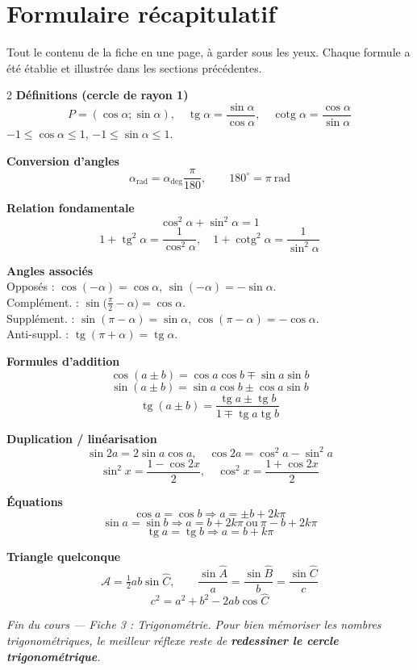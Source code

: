 \documentclass[11pt,a4paper]{article}
\DeclareMathOperator{\tg}{tg}        %
\DeclareMathOperator{\cotg}{cotg}    %
\newcommand{\degr}{^{\circ}}
\begin{document}
\section{Formulaire récapitulatif}
Tout le contenu de la fiche en une page, à garder sous les yeux. Chaque formule a été établie et
illustrée dans les sections précédentes.

\begin{tcolorbox}[boxbase,colback=primary!4,colframe=primary,
   title={\textsc{Mémo trigonométrie}}]
\setlength{\columnsep}{6mm}
\begin{multicols}{2}
\footnotesize
\textbf{\textcolor{primarydark}{Définitions (cercle de rayon 1)}}
\[
P=(\cos\alpha;\sin\alpha),\quad \tg\alpha=\frac{\sin\alpha}{\cos\alpha},\quad \cotg\alpha=\frac{\cos\alpha}{\sin\alpha}
\]
$-1\le\cos\alpha\le1$, \quad $-1\le\sin\alpha\le1$.

\smallskip
\textbf{\textcolor{primarydark}{Conversion d'angles}}
\[
\alpha_{\text{rad}}=\alpha_{\text{deg}}\frac{\pi}{180},\qquad
180\degr=\pi\ \text{rad}
\]

\textbf{\textcolor{primarydark}{Relation fondamentale}}
\[
\cos^2\alpha+\sin^2\alpha=1
\]
\[
1+\tg^2\alpha=\frac{1}{\cos^2\alpha},\quad 1+\cotg^2\alpha=\frac{1}{\sin^2\alpha}
\]

\textbf{\textcolor{primarydark}{Angles associés}}\\
Opposés : $\cos(-\alpha)=\cos\alpha$, $\sin(-\alpha)=-\sin\alpha$.\\
Complément. : $\sin\!\big(\tfrac{\pi}{2}-\alpha\big)=\cos\alpha$.\\
Supplément. : $\sin(\pi-\alpha)=\sin\alpha$, $\cos(\pi-\alpha)=-\cos\alpha$.\\
Anti-suppl. : $\tg(\pi+\alpha)=\tg\alpha$.

\columnbreak

\textbf{\textcolor{primarydark}{Formules d'addition}}
\[
\cos(a\pm b)=\cos a\cos b\mp\sin a\sin b
\]
\[
\sin(a\pm b)=\sin a\cos b\pm\cos a\sin b
\]
\[
\tg(a\pm b)=\frac{\tg a\pm\tg b}{1\mp\tg a\tg b}
\]

\textbf{\textcolor{primarydark}{Duplication / linéarisation}}
\[
\sin2a=2\sin a\cos a,\quad \cos2a=\cos^2a-\sin^2a
\]
\[
\sin^2x=\frac{1-\cos2x}{2},\quad \cos^2x=\frac{1+\cos2x}{2}
\]

\textbf{\textcolor{primarydark}{Équations}}
\[
\cos a=\cos b\Rightarrow a=\pm b+2k\pi
\]
\[
\sin a=\sin b\Rightarrow a=b+2k\pi\ \text{ou}\ \pi-b+2k\pi
\]
\[
\tg a=\tg b\Rightarrow a=b+k\pi
\]

\textbf{\textcolor{primarydark}{Triangle quelconque}}
\[
\mathcal{A}=\tfrac12 ab\sin\hat C,\qquad
\frac{\sin\hat A}{a}=\frac{\sin\hat B}{b}=\frac{\sin\hat C}{c}
\]
\[
c^2=a^2+b^2-2ab\cos\hat C
\]
\end{multicols}
\end{tcolorbox}

\begin{center}
\small\itshape\textcolor{black!60}{Fin du cours --- Fiche 3 : Trigonométrie. Pour bien mémoriser les
nombres trigonométriques, le meilleur réflexe reste de \textbf{redessiner le cercle trigonométrique}.}
\end{center}
\end{document}

